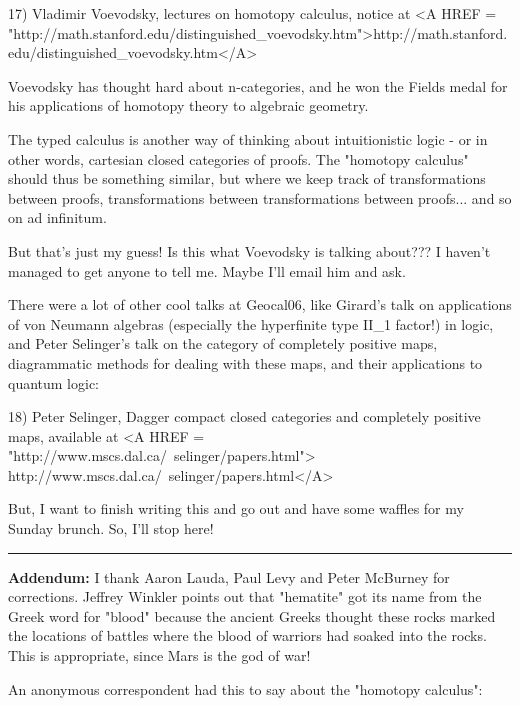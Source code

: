 17) Vladimir Voevodsky, lectures on homotopy \lambda  calculus, 
notice at <A HREF = "http://math.stanford.edu/distinguished_voevodsky.htm">http://math.stanford.edu/distinguished_voevodsky.htm</A>  

Voevodsky has thought hard about n-categories, and he won the 
Fields medal for his applications of homotopy theory to algebraic 
geometry.  

The typed \lambda  calculus is another way of thinking about intuitionistic 
logic - or in other words, cartesian closed categories of proofs.  The 
"homotopy \lambda  calculus" should thus be something similar, but where 
we keep track of transformations between proofs, transformations
between transformations between proofs... and so on ad infinitum.

But that's just my guess!  Is this what Voevodsky is talking about???
I haven't managed to get anyone to tell me.  Maybe I'll email him and ask.

There were a lot of other cool talks at Geocal06, like Girard's talk
on applications of von Neumann algebras (especially the hyperfinite 
type II_{1} 
factor!) in logic, and Peter Selinger's talk on the category of
completely positive maps, diagrammatic methods for dealing with these
maps, and their applications to quantum logic:

18) Peter Selinger, Dagger compact closed categories and completely
positive maps, available at 
<A HREF = "http://www.mscs.dal.ca/~selinger/papers.html">
http://www.mscs.dal.ca/~selinger/papers.html</A>

But, I want to finish writing this and go out and have some waffles
for my Sunday brunch.  So, I'll stop here!

\par\noindent\rule{\textwidth}{0.4pt}
\textbf{Addendum:} I thank Aaron Lauda, Paul Levy
and Peter McBurney for corrections.
Jeffrey Winkler points out that "hematite" got its name 
from the Greek word for "blood" because the ancient Greeks
thought these rocks marked the locations of battles where
the blood of warriors had soaked into the rocks.  This is appropriate,
since Mars is the god of war!   

An anonymous correspondent had this to say 
about the "homotopy \lambda  calculus":

